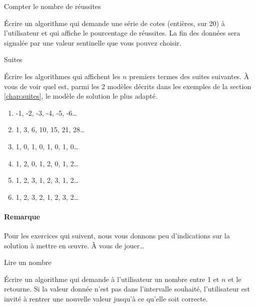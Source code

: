 		\begin{Exercice}{Compter le nombre de réussites}

			Écrire un algorithme qui demande une série
			de cotes (entières, sur 20) à l’utilisateur
			et qui affiche le pourcentage de réussites.
			La fin des données sera signalée 
			par une valeur sentinelle que vous pouvez choisir.
		\end{Exercice}

		\begin{Exercice}{Suites}

			Écrire les algorithmes qui affichent les $n$ premiers termes des
			suites suivantes.  À vous de voir quel est, parmi les 2 modèles
			décrits dans les exemples de la section \vref{chap:suites}, le
			modèle de solution le plus adapté.

			\begin{enumerate}[label=\alph*)]
				\item -1, -2, -3, -4, -5, -6\dots
				\item 1, 3, 6, 10, 15, 21, 28\dots
				\item 1, 0, 1, 0, 1, 0, 1, 0\dots
				\item 1, 2, 0, 1, 2, 0, 1, 2\dots
				\item 1, 2, 3, 1, 2, 3, 1, 2\dots
				\item 1, 2, 3, 2, 1, 2, 3, 2\dots
			\end{enumerate}			
		\end{Exercice}

\bigskip
\begin{Emphase}

	\paragraph{Remarque}

	Pour les exercices qui suivent, nous vous donnons peu d’indications sur la
	solution à mettre en \oe{}uvre.  À vous de jouer\dots{}

\end{Emphase}
\bigskip

		\begin{Exercice}{Lire un nombre}

			Écrire un algorithme qui demande à l’utilisateur un nombre entre
			1 et $n$ et le retourne.  Si la valeur donnée n’est pas dans
			l’intervalle souhaité, l’utilisateur est invité à rentrer une
			nouvelle valeur jusqu’à ce qu’elle soit correcte.
			
	\end{Exercice}


